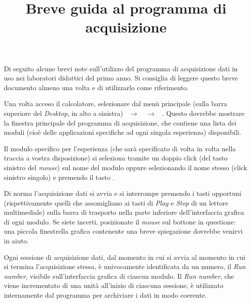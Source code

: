 \documentclass{lab1-article}
\title{Breve guida al programma di acquisizione}
\begin{document}
\begin{article}

\maketitle

\secsummary
Di seguito alcune brevi note sull'utilizzo del programma di acquisizione dati
in uso nei laboratori didattici del primo anno. Si consiglia di leggere
questo breve documento almeno una volta e di utilizzarlo come riferimento.



Una volta acceso il calcolatore, selezionare dal men\`u principale
(sulla barra superiore del \emph{Desktop}, in alto a sinistra)
~$\rightarrow$~~$\rightarrow$~%
. Questo dovrebbe mostrare la finestra principale del
programma di acquisizione, che contiene una lista dei moduli (cio\`e delle
applicazioni specifiche ad ogni singola esperienza) disponibili.



Il modulo specifico per l'esperienza (che sar\`a specificato di volta in volta
nella traccia a vostra disposizione) si seleziona tramite un doppio click
(del tasto sinistro del \emph{mouse}) sul nome del modulo oppure selezionando
il nome stesso (click sinistro singolo) e premendo il tasto .



Di norma l'acquisizione dati si avvia e si interrompe premendo i tasti opportuni
(rispettivamente quelli che assomigliano ai tasti di \emph{Play} e \emph{Stop}
di un lettore multimediale) sulla barra di trasporto nella parte inferiore
dell'interfaccia grafica di ogni modulo. Se siete incerti, posizionate il
\emph{mouse} sul bottone in questione: una piccola finestrella grafica
contenente una breve spiegazione dovrebbe venirvi in aiuto.

Ogni sessione di acquisizione dati, dal momento in cui si avvia al momento in
cui si termina l'acquisizione stessa, \`e univocamente identificata da un
numero, il \emph{Run number}, visibile sull'interfaccia grafica di ciascun
modulo. Il \emph{Run number}, che viene incrementato di una unit\`a all'inizio
di ciascuna sessione, \`e utilizzato internamente dal programma per archiviare
i dati in modo coerente.



\end{article}
\end{document}
